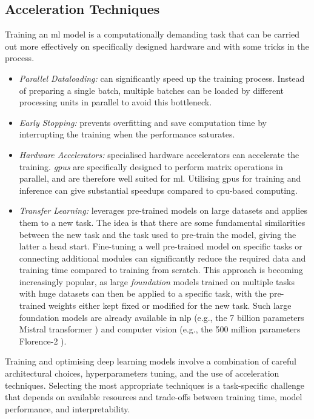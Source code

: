 \subsection{Acceleration Techniques}
Training an \gls{ml} model is a computationally demanding task that can be carried out more effectively on specifically designed hardware and with some tricks in the process. 
\begin{itemize}[leftmargin=*]
    \item \textit{Parallel Dataloading:} can significantly speed up the training process. Instead of preparing a single batch, multiple batches can be loaded by different processing units in parallel to avoid this bottleneck. 
    \item \textit{Early Stopping:} prevents overfitting and save computation time by interrupting the training when the performance saturates.
    \item  \textit{Hardware Accelerators:} specialised hardware accelerators can accelerate the training. \textit{\glspl{gpu}} are specifically designed to perform matrix operations in parallel, and are therefore well suited for \gls{ml}. Utilising \glspl{gpu} for training and inference can give substantial speedups compared to \gls{cpu}-based computing. 
    \item \textit{Transfer Learning:} leverages pre-trained models on large datasets and applies them to a new task. The idea is that there are some fundamental similarities between the new task and the task used to pre-train the model, giving the latter a head start. Fine-tuning a well pre-trained model on specific tasks or connecting additional modules can significantly reduce the required data and training time compared to training from scratch. This approach is becoming increasingly popular, as large \textit{foundation} models trained on multiple tasks with huge datasets can then be applied to a specific task, with the pre-trained weights either kept fixed or modified for the new task. Such large foundation models are already available in \gls{nlp} (e.g., the 7 billion parameters Mistral transformer \cite{jiang2023mistral}) and computer vision (e.g., the 500 million parameters Florence-2 \cite{xiao2023florence2}).
\end{itemize}
Training and optimising deep learning models involve a combination of careful architectural choices, hyperparameters tuning, and the use of acceleration techniques. Selecting the most appropriate techniques is a task-specific challenge that depends on available resources and trade-offs between training time, model performance, and interpretability.
